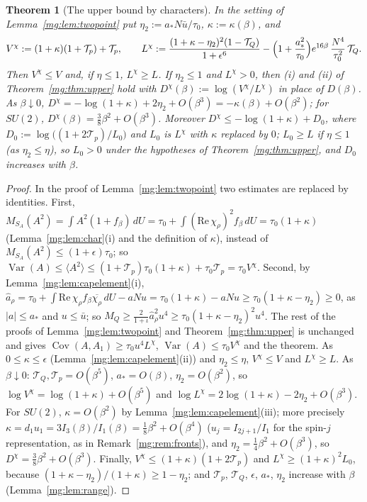 \documentclass[11pt,a4paper]{article}
\newtheorem{theorem}{Theorem}[section]
\theoremstyle{definition}
\theoremstyle{remark}
\DeclareMathOperator{\Cov}{Cov}
\DeclareMathOperator{\Var}{Var}
\newcommand{\dU}{\,dU}
\begin{document}
\begin{theorem}[The upper bound by characters]\label{mg:thm:upperchar}
In the setting of Lemma~\ref{mg:lem:twopoint} put $\eta_2:=a_*N\bar u/\tau_0$, $\kappa:=\kappa(\beta)$, and
\[
V^\chi:=(1+\kappa)(1+\mathcal T_p)+\mathcal T_p,\qquad L^\chi:=\frac{(1+\kappa-\eta_2)^2(1-\mathcal T_Q)}{1+\epsilon^6}-\Bigl(1+\frac{a_*^2}{\tau_0}\Bigr)e^{16\beta}\,
\frac{N^4}{\tau_0^2}\,\mathcal T_Q .
\]
Then $V^\chi\le V$ and, if $\eta\le1$, $L^\chi\ge L$. If $\eta_2\le1$ and $L^\chi>0$, then (i) and (ii) of Theorem~\ref{mg:thm:upper} hold with
$D^\chi(\beta):=\log(V^\chi/L^\chi)$ in place of $D(\beta)$. As $\beta\downarrow0$, $D^\chi=-\log(1+\kappa)+2\eta_2+O(\beta^3)=-\kappa(\beta)+O(\beta^2)$; for
$SU(2)$, $D^\chi(\beta)=\frac38\beta^2+O(\beta^3)$. Moreover $D^\chi\le-\log(1+\kappa)+D_0$, where
$D_0:=\log\bigl((1+2\mathcal T_p)/L_0\bigr)$ and $L_0$ is $L^\chi$ with $\kappa$ replaced by $0$; $L_0\ge L$ if $\eta\le1$ (as $\eta_2\le\eta$), so $L_0>0$ under the hypotheses of
Theorem~\ref{mg:thm:upper}, and $D_0$ increases with $\beta$.
\end{theorem}

\begin{proof}
In the proof of Lemma~\ref{mg:lem:twopoint} two estimates are replaced by identities. First, $M_{S_A}(A^2)=\int A^2(1+f_\beta)\dU=\tau_0+\int(\mathrm{Re}\,\chi_\rho)^2
f_\beta\dU=\tau_0(1+\kappa)$ (Lemma~\ref{mg:lem:char}(i) and the definition of $\kappa$), instead of $M_{S_A}(A^2)\le(1+\epsilon)\tau_0$; so
$\Var(A)\le\langle A^2\rangle\le(1+\mathcal T_p)\tau_0(1+\kappa)+\tau_0\mathcal T_p=\tau_0V^\chi$. Second, by Lemma~\ref{mg:lem:capelement}(i),
$\hat a_\rho=\tau_0+\int\mathrm{Re}\,\chi_\rho f_\beta\overline{\chi_\rho}\dU-aNu=\tau_0(1+\kappa)-aNu\ge\tau_0(1+\kappa-\eta_2)\ge0$, as $|a|\le a_*$ and
$u\le\bar u$; so $M_Q\ge\frac2{1+\iota}\hat a_\rho^2u^4\ge\tau_0(1+\kappa-\eta_2)^2u^4$. The rest of the proofs of Lemma~\ref{mg:lem:twopoint} and
Theorem~\ref{mg:thm:upper} is unchanged and gives $\Cov(A,A_1)\ge\tau_0u^4L^\chi$, $\Var(A)\le\tau_0V^\chi$ and the theorem. As $0\le\kappa\le\epsilon$
(Lemma~\ref{mg:lem:capelement}(ii)) and $\eta_2\le\eta$, $V^\chi\le V$ and $L^\chi\ge L$. As $\beta\downarrow0$: $\mathcal T_Q,\mathcal T_p=O(\beta^5)$,
$a_*=O(\beta)$, $\eta_2=O(\beta^2)$, so $\log V^\chi=\log(1+\kappa)+O(\beta^5)$ and $\log L^\chi=2\log(1+\kappa)-2\eta_2+O(\beta^3)$. For $SU(2)$,
$\kappa=O(\beta^2)$ by Lemma~\ref{mg:lem:capelement}(iii); more precisely $\kappa=d_1u_1=3I_3(\beta)/I_1(\beta)=\frac18\beta^2+O(\beta^4)$ ($u_j=I_{2j+1}/I_1$
for the spin-$j$ representation, as in Remark~\ref{mg:rem:fronts}), and $\eta_2=\frac14\beta^2+O(\beta^3)$, so $D^\chi=\frac38\beta^2+O(\beta^3)$. Finally,
$V^\chi\le(1+\kappa)(1+2\mathcal T_p)$ and $L^\chi\ge(1+\kappa)^2L_0$, because $(1+\kappa-\eta_2)/(1+\kappa)\ge1-\eta_2$; and $\mathcal T_p$, $\mathcal T_Q$,
$\epsilon$, $a_*$, $\eta_2$ increase with $\beta$ (Lemma~\ref{mg:lem:range}).
\end{proof}
\end{document}
